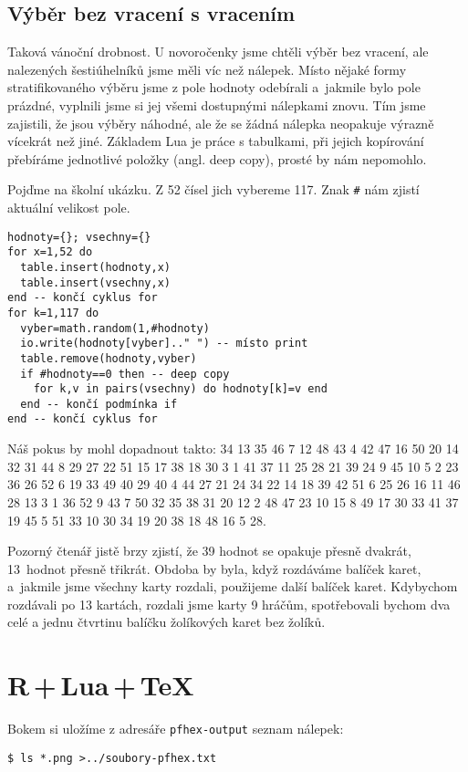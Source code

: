 \subsection{Výběr bez vracení s vracením}
Taková vánoční drobnost. U novoročenky jsme chtěli výběr bez vracení, ale nalezených šestiúhelníků jsme měli víc než nálepek. Místo nějaké formy stratifikovaného výběru jsme z pole hodnoty odebírali a~jakmile bylo pole prázdné, vyplnili jsme si jej všemi dostupnými nálepkami znovu. Tím jsme zajistili, že jsou výběry náhodné, ale že se žádná nálepka neopakuje výrazně vícekrát než jiné. Základem Lua je práce s tabulkami, při jejich kopírování přebíráme jednotlivé položky (angl. deep copy), prosté  by nám nepomohlo.

Pojďme na školní ukázku. Z 52 čísel jich vybereme 117. Znak \texttt{\#} nám zjistí aktuální velikost pole.

\begin{lstlisting}
hodnoty={}; vsechny={}
for x=1,52 do 
  table.insert(hodnoty,x) 
  table.insert(vsechny,x) 
end -- končí cyklus for
for k=1,117 do
  vyber=math.random(1,#hodnoty) 
  io.write(hodnoty[vyber].." ") -- místo print
  table.remove(hodnoty,vyber)
  if #hodnoty==0 then -- deep copy
    for k,v in pairs(vsechny) do hodnoty[k]=v end
  end -- končí podmínka if
end -- končí cyklus for
\end{lstlisting}

Náš pokus by mohl dopadnout takto:
34 13 35 46 7 12 48 43 4 42 47 16 50 20 14 32 31 44 8 29 27 22 51 15 17 38 18 30 3 1 41 37 11 25 28 21 39 24 9 45 10 5 2 23 36 26 52 6 19 33 49 40 29 40 4 44 27 21 24 34 22 14 18 39 42 51 6 25 26 16 11 46 28 13 3 1 36 52 9 43 7 50 32 35 38 31 20 12 2 48 47 23 10 15 8 49 17 30 33 41 37 19 45 5 51 33 10 30 34 19 20 38 18 48 16 5 28.

Pozorný čtenář jistě brzy zjistí, že 39 hodnot se opakuje přesně dvakrát, 13~hodnot přesně třikrát. Obdoba by byla, když rozdáváme balíček karet, a~jakmile jsme všechny karty rozdali, použijeme další balíček karet. Kdybychom rozdávali po 13 kartách, rozdali jsme karty 9 hráčům, spotřebovali bychom dva celé a jednu čtvrtinu balíčku žolíkových karet bez žolíků.

\section{R\,+\,Lua\,+\,\TeX}
Bokem si uložíme z adresáře \texttt{pfhex-output} seznam nálepek:
\begin{lstlisting}
$ ls *.png >../soubory-pfhex.txt
\end{lstlisting}

